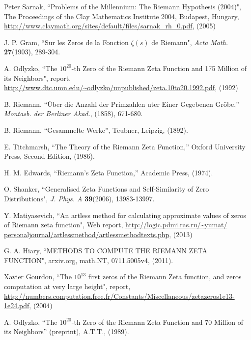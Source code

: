 \documentclass[twoside]{article}
\theoremstyle{definition}
\begin{document}
\begin{thebibliography} {}

 Peter Sarnak,
``Problems of the Millennium: The Riemann Hypothesis (2004)", The Proceedings of the Clay Mathematics Institute 2004, Budapest, Hungary,
\url{http://www.claymath.org/sites/default/files/sarnak_rh_0.pdf}, (2005)

 J. P. Gram, 
``Sur les Zeros de la Fonction  $\zeta ( s )$  de Riemann",
{\it Acta Math.} {\bf27}(1903), 289-304.

  A. Odlyzko,
``The $10^{20}$-th Zero of the Riemann Zeta
Function and 175 Million of its Neighbors", report,
\url{http://www.dtc.umn.edu/~odlyzko/unpublished/zeta.10to20.1992.pdf}, (1992)


 B. Riemann, ``\"{U}ber die Anzahl der Primzahlen uter
Einer Gegebenen Gr\"{o}be,'' {\it Montasb. der Berliner Akad.}, (1858),
671-680.

 B. Riemann, ``Gesammelte Werke'', Teubner, Leipzig, (1892).

 E. Titchmarsh, ``The Theory of the Riemann Zeta
Function,'' Oxford University Press, Second Edition, (1986).

 H. M. Edwards, ``Riemann's Zeta Function,'' 
Academic Press,  (1974).

 O. Shanker, 
``Generalised Zeta Functions and Self-Similarity of Zero Distributions",
{\it J.  Phys. A} {\bf39}(2006), 13983-13997.

 Y. Matiyasevich, 
``An artless method for calculating approximate values of
zeros of Riemann zeta function",
Web report, \url{http://logic.pdmi.ras.ru/~yumat/
personaljournal/artlessmethod/artlessmethodtexts.php}, (2013)

 G. A. Hiary,
``METHODS TO COMPUTE THE RIEMANN ZETA
FUNCTION", arxiv.org, math.NT, 0711.5005v4, (2011).

 Xavier Gourdon,
``The $10^{13}$ first zeros of the Riemann Zeta function,
and zeros computation at very large height", report,
\url{http://numbers.computation.free.fr/Constants/Miscellaneous/zetazeros1e13-1e24.pdf}, (2004)

 A. Odlyzko, ``The $10^{20}$-th Zero of the Riemann Zeta
Function and 70 Million of its Neighbors'' (preprint), A.T.T., (1989).


\end{thebibliography} 
\end{document}
